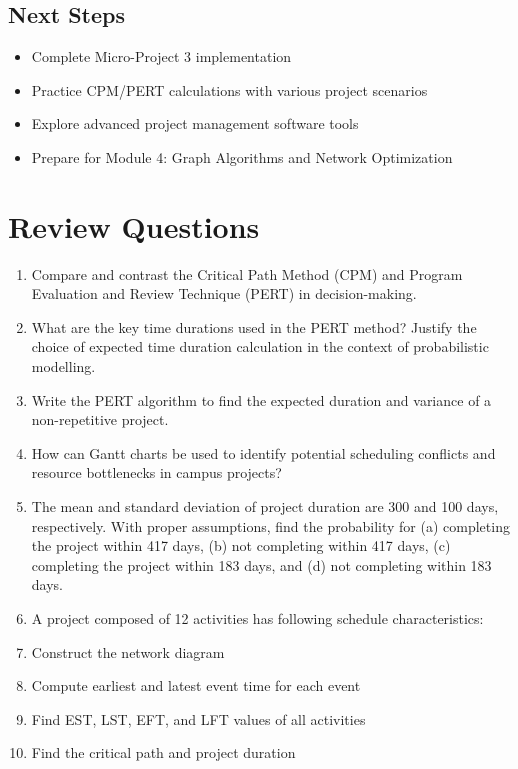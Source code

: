 \documentclass[
  letterpaper,
  DIV=11,
  numbers=noendperiod]{scrreprt}
\providecommand{\tightlist}{%
  \setlength{\itemsep}{0pt}\setlength{\parskip}{0pt}}
\begin{document}
\subsection{Next Steps}\label{next-steps}

\begin{itemize}
\tightlist
\item
  Complete Micro-Project 3 implementation
\item
  Practice CPM/PERT calculations with various project scenarios
\item
  Explore advanced project management software tools
\item
  Prepare for Module 4: Graph Algorithms and Network Optimization
\end{itemize}

\section{Review Questions}\label{review-questions-11}

\begin{enumerate}
\def\labelenumi{\arabic{enumi}.}
\item
  Compare and contrast the Critical Path Method (CPM) and Program
  Evaluation and Review Technique (PERT) in decision-making.
\item
  What are the key time durations used in the PERT method? Justify the
  choice of expected time duration calculation in the context of
  probabilistic modelling.
\item
  Write the PERT algorithm to find the expected duration and variance of
  a non-repetitive project.
\item
  How can Gantt charts be used to identify potential scheduling
  conflicts and resource bottlenecks in campus projects?
\item
  The mean and standard deviation of project duration are 300 and 100
  days, respectively. With proper assumptions, find the probability for
  (a) completing the project within 417 days, (b) not completing within
  417 days, (c) completing the project within 183 days, and (d) not
  completing within 183 days.
\item
  A project composed of 12 activities has following schedule
  characteristics:
\item
  Construct the network diagram
\item
  Compute earliest and latest event time for each event
\item
  Find EST, LST, EFT, and LFT values of all activities
\item
  Find the critical path and project duration
\end{enumerate}
\end{document}

